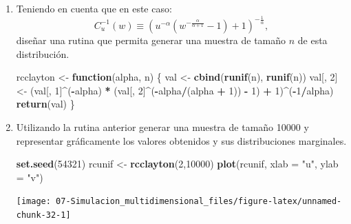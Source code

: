 \documentclass[]{book}
\newenvironment{Shaded}{\begin{snugshade}}{\end{snugshade}}
\newcommand{\KeywordTok}[1]{\textcolor[rgb]{0.13,0.29,0.53}{\textbf{#1}}}
\newcommand{\DataTypeTok}[1]{\textcolor[rgb]{0.13,0.29,0.53}{#1}}
\newcommand{\DecValTok}[1]{\textcolor[rgb]{0.00,0.00,0.81}{#1}}
\newcommand{\StringTok}[1]{\textcolor[rgb]{0.31,0.60,0.02}{#1}}
\newcommand{\ControlFlowTok}[1]{\textcolor[rgb]{0.13,0.29,0.53}{\textbf{#1}}}
\newcommand{\OperatorTok}[1]{\textcolor[rgb]{0.81,0.36,0.00}{\textbf{#1}}}
\newcommand{\NormalTok}[1]{#1}
\theoremstyle{definition}
\theoremstyle{definition}
\theoremstyle{definition}
\theoremstyle{remark}
\begin{document}
\begin{enumerate}
\def\labelenumi{\alph{enumi})}
\item
  Teniendo en cuenta que en este caso:
  \[C_{u}^{-1}(w)\equiv\left(  u^{-\alpha}\left(  
  w^{-\frac{\alpha}{\alpha+1}}-1\right) + 1 \right)^{-\frac{1}{\alpha}},\]
  diseñar una rutina que permita generar una muestra de tamaño \(n\) de
  esta distribución.

\begin{Shaded}
\begin{Highlighting}[]
\NormalTok{rcclayton <-}\StringTok{ }\ControlFlowTok{function}\NormalTok{(alpha, n) \{}
\NormalTok{  val <-}\StringTok{ }\KeywordTok{cbind}\NormalTok{(}\KeywordTok{runif}\NormalTok{(n), }\KeywordTok{runif}\NormalTok{(n))}
\NormalTok{  val[, }\DecValTok{2}\NormalTok{] <-}\StringTok{ }\NormalTok{(val[, }\DecValTok{1}\NormalTok{]}\OperatorTok{^}\NormalTok{(}\OperatorTok{-}\NormalTok{alpha) }\OperatorTok{*}\StringTok{ }
\StringTok{              }\NormalTok{(val[, }\DecValTok{2}\NormalTok{]}\OperatorTok{^}\NormalTok{(}\OperatorTok{-}\NormalTok{alpha}\OperatorTok{/}\NormalTok{(alpha }\OperatorTok{+}\StringTok{ }\DecValTok{1}\NormalTok{)) }\OperatorTok{-}\StringTok{ }\DecValTok{1}\NormalTok{) }\OperatorTok{+}\StringTok{ }\DecValTok{1}\NormalTok{)}\OperatorTok{^}\NormalTok{(}\OperatorTok{-}\DecValTok{1}\OperatorTok{/}\NormalTok{alpha)}
  \KeywordTok{return}\NormalTok{(val)}
\NormalTok{\}}
\end{Highlighting}
\end{Shaded}
\item
  Utilizando la rutina anterior generar una muestra de tamaño 10000 y
  representar gráficamente los valores obtenidos y sus distribuciones
  marginales.

\begin{Shaded}
\begin{Highlighting}[]
\KeywordTok{set.seed}\NormalTok{(}\DecValTok{54321}\NormalTok{)}
\NormalTok{rcunif <-}\StringTok{ }\KeywordTok{rcclayton}\NormalTok{(}\DecValTok{2}\NormalTok{,}\DecValTok{10000}\NormalTok{)}
\KeywordTok{plot}\NormalTok{(rcunif, }\DataTypeTok{xlab =} \StringTok{"u"}\NormalTok{, }\DataTypeTok{ylab =} \StringTok{"v"}\NormalTok{)}
\end{Highlighting}
\end{Shaded}

  \begin{center}\texttt{[image: 07-Simulacion\_multidimensional\_files/figure-latex/unnamed-chunk-32-1]} \end{center}


\end{enumerate}
\end{document}
